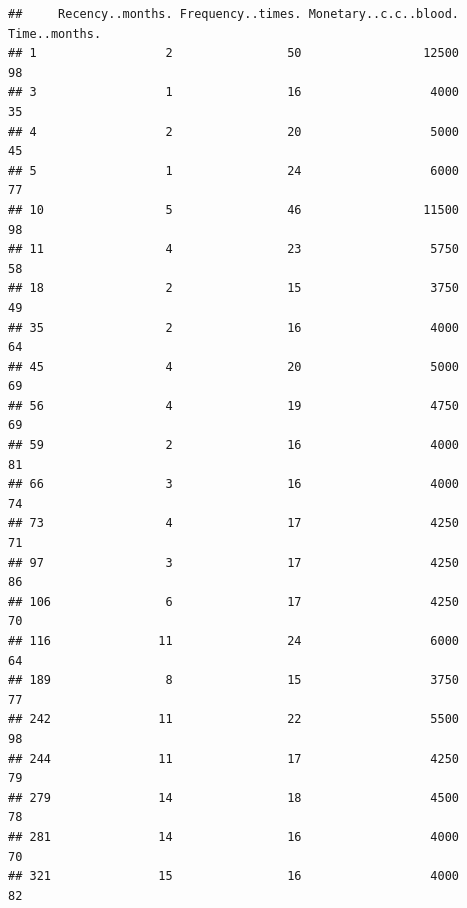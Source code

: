 \documentclass[
]{article}
\newenvironment{Shaded}{\begin{snugshade}}{\end{snugshade}}
\newcommand{\CommentTok}[1]{\textcolor[rgb]{0.56,0.35,0.01}{\textit{#1}}}
\newcommand{\KeywordTok}[1]{\textcolor[rgb]{0.13,0.29,0.53}{\textbf{#1}}}
\newcommand{\NormalTok}[1]{#1}
\newcommand{\OperatorTok}[1]{\textcolor[rgb]{0.81,0.36,0.00}{\textbf{#1}}}
\newcommand{\StringTok}[1]{\textcolor[rgb]{0.31,0.60,0.02}{#1}}
\begin{document}
\begin{Shaded}
\end{Shaded}

\begin{verbatim}
##     Recency..months. Frequency..times. Monetary..c.c..blood. Time..months.
## 1                  2                50                 12500            98
## 3                  1                16                  4000            35
## 4                  2                20                  5000            45
## 5                  1                24                  6000            77
## 10                 5                46                 11500            98
## 11                 4                23                  5750            58
## 18                 2                15                  3750            49
## 35                 2                16                  4000            64
## 45                 4                20                  5000            69
## 56                 4                19                  4750            69
## 59                 2                16                  4000            81
## 66                 3                16                  4000            74
## 73                 4                17                  4250            71
## 97                 3                17                  4250            86
## 106                6                17                  4250            70
## 116               11                24                  6000            64
## 189                8                15                  3750            77
## 242               11                22                  5500            98
## 244               11                17                  4250            79
## 279               14                18                  4500            78
## 281               14                16                  4000            70
## 321               15                16                  4000            82

\end{verbatim}
\end{document}
